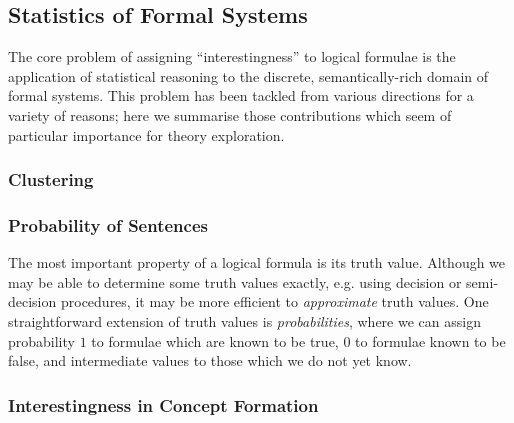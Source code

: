 \subsection{Statistics of Formal Systems}

The core problem of assigning ``interestingness'' to logical formulae is the
application of statistical reasoning to the discrete, semantically-rich domain
of formal systems. This problem has been tackled from various directions for a
variety of reasons; here we summarise those contributions which seem of
particular importance for theory exploration.


\subsubsection{Clustering}
\label{sec:clustering}

\cite{journals/corr/abs-1212-3618}
\cite{heras2013proof}

\subsubsection{Probability of Sentences}

The most important property of a logical formula is its truth value. Although we
may be able to determine some truth values exactly, e.g. using decision or
semi-decision procedures, it may be more efficient to \emph{approximate} truth
values. One straightforward extension of truth values is \emph{probabilities},
where we can assign probability $1$ to formulae which are known to be true, $0$
to formulae known to be false, and intermediate values to those which we do not
yet know.

\cite{Hutter.Lloyd.Ng.ea:2013}

\subsubsection{Interestingness in Concept Formation}
\label{sec:conceptformation}

\cite{Montano-Rivas.McCasland.Dixon.ea:2012}
\cite{Piantadosi.Tenenbaum.Goodman:2012}
\cite{Wille:2005}
\cite{colton1999automatic}
\cite{colton2000agent}
\cite{colton2012automated}
\cite{lenat1977automated}
\cite{mullerunderstanding}
\cite{Bundy.Cavallo.Dixon.ea:2015}
\cite{johansson2009isacosy}
\cite{spector2008genetic}
\cite{colton2012automated}
 \cite{geng2006interestingness}

